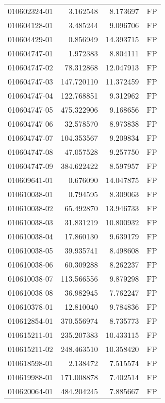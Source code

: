 \begin{tabular}{lrrl}
010602324-01 &    3.162548 &       8.173697 &   FP \\
010604128-01 &    3.485244 &       9.096706 &   FP \\
010604429-01 &    0.856949 &      14.393715 &   FP \\
010604747-01 &    1.972383 &       8.804111 &   FP \\
010604747-02 &   78.312868 &      12.047913 &   FP \\
010604747-03 &  147.720110 &      11.372459 &   FP \\
010604747-04 &  122.768851 &       9.312962 &   FP \\
010604747-05 &  475.322906 &       9.168656 &   FP \\
010604747-06 &   32.578570 &       8.973838 &   FP \\
010604747-07 &  104.353567 &       9.209834 &   FP \\
010604747-08 &   47.057528 &       9.257750 &   FP \\
010604747-09 &  384.622422 &       8.597957 &   FP \\
010609641-01 &    0.676090 &      14.047875 &   FP \\
010610038-01 &    0.794595 &       8.309063 &   FP \\
010610038-02 &   65.492870 &      13.946733 &   FP \\
010610038-03 &   31.831219 &      10.800932 &   FP \\
010610038-04 &   17.860130 &       9.639179 &   FP \\
010610038-05 &   39.935741 &       8.498608 &   FP \\
010610038-06 &   60.309288 &       8.262237 &   FP \\
010610038-07 &  113.566556 &       9.879298 &   FP \\
010610038-08 &   36.982945 &       7.762247 &   FP \\
010610378-01 &   12.810040 &       9.784836 &   FP \\
010612854-01 &  370.556974 &       8.735773 &   FP \\
010615211-01 &  235.207383 &      10.433115 &   FP \\
010615211-02 &  248.463510 &      10.358420 &   FP \\
010618598-01 &    2.138472 &       7.515574 &   FP \\
010619988-01 &  171.008878 &       7.402514 &   FP \\
010620064-01 &  484.204245 &       7.885667 &   FP \\

\end{tabular}
